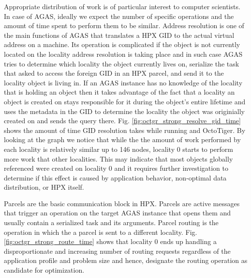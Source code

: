 Appropriate distribution of work is of particular interest to computer
scientists. In case of AGAS, ideally we expect the number of specific
operations and the amount of time spent to perform them to be similar. Address
resolution is one of the main functions of AGAS that translates a HPX GID to
the actual virtual address on a machine. Its operation is complicated if the
object is not currently located on the locality address resolution is taking
place and in such case AGAS tries to determine which locality the object
currently lives on, serialize the task that asked to access the foreign GID in
an HPX parcel, and send it to the locality object is living in. If an AGAS
instance has no knowledge of the locality that is holding an object then it
takes advantage of the fact that a locality an object is created on stays
responsible for it during the object's entire lifetime and uses the metadata in
the GID to determine the locality the object was originially created on and
sends the query there. Fig. \ref{fig:octgr_strong_resolve_gid_time} shows the
amount of time GID resolution takes while running and OctoTiger. By looking at
the graph we notice that while the the amount of work performed by each
locality is relatively similar up to 146 nodes, locality 0 starts to perform
more work that other localities. This may indicate that most objects globally
referenced were created on locality 0 and it requires further investigation to
determine if this effect is caused by application behavior, non-optimal data
distribution, or HPX itself.

Parcels are the basic communication block in HPX. Parcels are active messages
that trigger an operation on the target AGAS instance that opens them and
usually contain a serialized task and its arguments. Parcel routing is the
operation in which the a parcel is sent to a different locality. Fig.
\ref{fig:octgr_strong_route_time} shows that locality 0 ends up handling a
disproportionate and increasing number of routing requests regardless of the
application profile and problem size and hence, designate the routing operation
as candidate for optimization.

